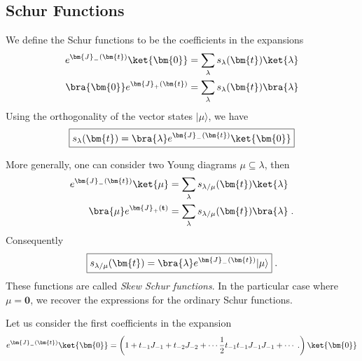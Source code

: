 
\subsection{Schur Functions}

We define the Schur functions to be the coefficients in the expansions
\begin{equation}
\label{evol}
\begin{split}
    e^{\bm{J}_-(\bm{t})} \ket{\bm{0}}
    & = \sum_\lambda s_{\lambda}(\bm{t}) \ket{\lambda} \\
    \bra{\bm{0}} e^{\bm{J}_+(\bm{t})} 
    &= \sum_\lambda s_{\lambda}(\bm{t})\bra{\lambda}  
\end{split}
\end{equation}
Using the orthogonality of the vector states \(|\mu\rangle\), we have
\begin{equation}
\boxed{
s_{\lambda}(\bm{t}) = 
\bra{\lambda} e^{\bm{J}_-(\bm{t})} \ket{\bm{0}}}
\end{equation}

More generally, one can consider two Young diagrams
\(\mu \subseteq \lambda\), then
\begin{equation}
  \label{eq:skschur}
\begin{split}
e^{\bm{J}_-(\bm{t})} \ket{\mu}
& = \sum_\lambda s_{\lambda/\mu}(\bm{t})\ket{\lambda} \\
\bra{\mu} e^{\bm{J}_+(\mathbf{t})} 
&= \sum_\lambda s_{\lambda/\mu}(\bm{t}) \bra{\lambda}\; .
\end{split}
\end{equation}
Consequently
\begin{equation}
\boxed{
s_{\lambda/\mu}(\bm{t}) = 
 \bra{\lambda}e^{\bm{J}_-(\bm{t})}|\mu\rangle}\;. 
\end{equation}
These functions are called \emph{Skew Schur functions}. 
In the particular case where \(\mu =\bm{0}\), we recover the
expressions for the ordinary Schur functions.

Let us consider the first coefficients in the expansion
\begin{equation}
e^{\bm{J}_-(\bm{t})} \ket{\bm{0}}=\left(
1 + t_{-1}J_{-1} + t_{-2}J_{-2} + \cdots 
\frac{1}{2}t_{-1}t_{-1}J_{-1} J_{-1} + \cdots\; .
\right)
\ket{\bm{0}}
\end{equation}

